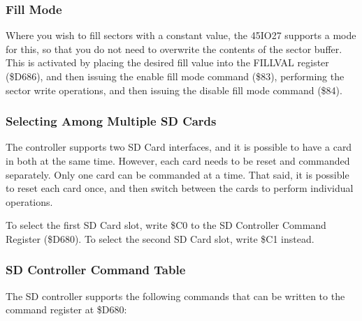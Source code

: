 \subsubsection{Fill Mode}

Where you wish to fill sectors with a constant value, the 45IO27
supports a mode for this, so that you do not need to overwrite the
contents of the sector buffer. This is activated by placing the
desired fill value into the FILLVAL register (\$D686), and then
issuing the enable fill mode command (\$83), performing the sector
write operations, and then issuing the disable fill mode command
(\$84). 

\subsubsection{Selecting Among Multiple SD Cards}

The controller supports two SD Card interfaces, and it is possible to
have a card in both at the same time.  However, each card needs to be
reset and commanded separately.  Only one card can be commanded at a
time.  That said, it is possible to reset each card once, and then
switch between the cards to perform individual operations.

To select the first SD Card slot, write \$C0 to the SD Controller
Command Register (\$D680).  To select the second SD Card slot, write
\$C1 instead.

\subsubsection{SD Controller Command Table}

The SD controller supports the following commands that can be written
to the command register at \$D680:

